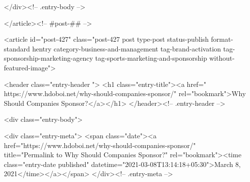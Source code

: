		
			</div><!-- .entry-body -->

</article><!-- #post-## -->

			
				
<article id="post-427" class="post-427 post type-post status-publish format-standard hentry category-business-and-management tag-brand-activation tag-sponsorship-marketing-agency tag-sports-marketing-and-sponsorship without-featured-image">

	
	<header class="entry-header ">
					<h1 class="entry-title"><a href=" https://www.hdoboi.net/why-should-companies-sponsor/" rel="bookmark">Why Should Companies Sponsor?</a></h1>			</header><!-- .entry-header -->

	<div class="entry-body">

				<div class="entry-meta">
			<span class="date"><a href="https://www.hdoboi.net/why-should-companies-sponsor/" title="Permalink to Why Should Companies Sponsor?" rel="bookmark"><time class="entry-date published" datetime="2021-03-08T13:14:18+05:30">March 8, 2021</time></a></span>		</div><!-- .entry-meta -->
		
